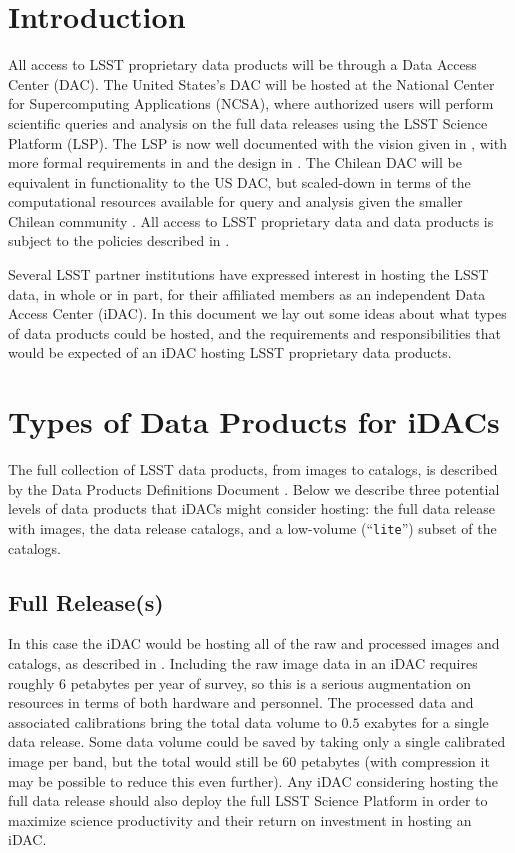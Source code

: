 
\section{Introduction}\label{sec:intro}

All access to LSST proprietary data products will be through a Data Access Center (DAC). The United States's DAC will be hosted at the National Center for Supercomputing Applications (NCSA), where authorized users will perform scientific queries and analysis on the full data releases using the LSST Science Platform (LSP). The LSP is now well documented with the vision given in , with more formal requirements in  and the design in . The Chilean DAC will be equivalent in functionality to the US DAC, but scaled-down in terms of the computational resources available for query and analysis given the smaller Chilean community . All access to LSST proprietary data and data products is subject to the policies described in .

Several LSST partner institutions have expressed interest in hosting the LSST data, in whole or in part, for their affiliated members as an independent Data Access Center (iDAC). In this document we lay out some ideas about what types of data products could be hosted, and the requirements and responsibilities that would be expected of an iDAC hosting LSST proprietary data products.


\section{Types of Data Products for iDACs}\label{sec:data}

The full collection of LSST data products, from images to catalogs, is described by the Data Products Definitions Document . Below we describe three potential levels of data products that iDACs might consider hosting: the full data release with images, the data release catalogs, and a low-volume (``{\tt lite}'') subset of the catalogs.

\subsection{Full Release(s)}

In this case the iDAC would be hosting all of the raw and processed images and catalogs, as described in . Including the raw image data in an iDAC requires roughly $6$ petabytes per year of survey, so this is a serious augmentation on resources in terms of both hardware and personnel. The processed data and associated calibrations bring the total data volume to $0.5$ exabytes for a single data release. Some data volume could be saved by taking only a single calibrated image per band, but the total would still be $60$ petabytes (with compression it may be possible to reduce this even further). Any iDAC considering hosting the full data release should also deploy the full LSST Science Platform  in order to maximize science productivity and their return on investment in hosting an iDAC.

